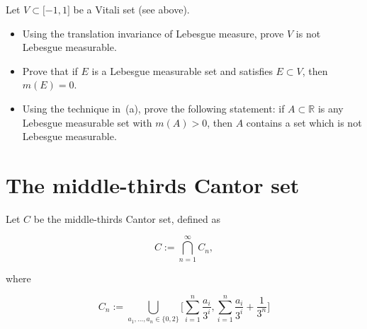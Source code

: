 Let \(V \subset \lbrack - 1,1\rbrack\) be a Vitali set (see above).

\begin{itemize}
\item
  Using the translation invariance of Lebesgue measure, prove \(V\) is not Lebesgue measurable.
\item
  Prove that if \(E\) is a Lebesgue measurable set and satisfies \(E \subset V\), then \(m(E) = 0\).
\item
  Using the technique in~(a), prove the following statement: if \(A \subset \mathbb{R}\) is any Lebesgue measurable set with \(m(A) > 0\), then \(A\) contains a set which is not Lebesgue measurable.
\end{itemize}

\section{The middle-thirds Cantor set}\label{the-middle-thirds-cantor-set}

Let \(C\) be the middle-thirds Cantor set, defined as

\[C := \bigcap\limits_{n = 1}^{\infty}C_{n},\]

where

\[C_{n} := \bigcup\limits_{a_{1},\ldots,a_{n} \in {\{{0,2}\}}}\lbrack\sum\limits_{i = 1}^{n}\frac{a_{i}}{3^{i}},\sum\limits_{i = 1}^{n}\frac{a_{i}}{3^{i}} + \frac{1}{3^{n}}\rbrack\]

